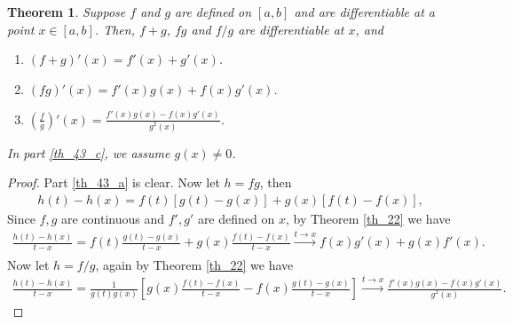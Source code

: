 \documentclass[10pt]{book}
\newtheorem{theorem}{Theorem}[chapter]
\theoremstyle{definition}
\numberwithin{equation}{chapter}
\begin{document}
\medskip

\begin{theorem}\label{th_43}
Suppose $f$ and $g$ are defined on $[a,b]$ and are differentiable at a point $x \in [a,b]$. Then, $f + g$, $fg$ and $f/g$ are differentiable at $x$, and
\begin{enumerate}[label=(\alph*)]
    \item $(f + g)'(x) = f'(x) + g'(x)$. \label{th_43_a}
    
    \item $(fg)'(x) = f'(x)g(x) + f(x)g'(x)$. \label{th_43_b}
    
    \item $\displaystyle \left(\frac{f}{g}\right)'(x) = \frac{f'(x)g(x) - f(x)g'(x)}{g^2(x)}$. \label{th_43_c}
\end{enumerate}
In part \ref{th_43_c}, we assume $g(x) \neq 0$.
\end{theorem}
\begin{proof}
Part \ref{th_43_a} is clear. Now let $h = fg$, then
\begin{align*}
    h(t) - h(x) = f(t)[g(t) - g(x)] + g(x)[f(t) - f(x)],
\end{align*}
Since $f, g$ are continuous and $f',g'$ are defined on $x$, by Theorem \ref{th_22} we have
\begin{align*}
    \frac{h(t) - h(x)}{t - x} = f(t) \frac{g(t) - g(x)}{t - x} + g(x) \frac{f(t) - f(x)}{t - x} \xrightarrow[]{t \to x} f(x)g'(x) + g(x) f'(x).
\end{align*}
Now let $h = f/g$, again by Theorem \ref{th_22} we have
\begin{align*}
    \frac{h(t) - h(x)}{t - x} = \frac{1}{g(t)g(x)} \left[g(x) \frac{f(t) - f(x)}{t - x} - f(x) \frac{g(t) - g(x)}{t - x} \right] \xrightarrow[]{t \to x} \frac{f'(x)g(x) - f(x)g'(x)}{g^2(x)}.
\end{align*}
\end{proof}

\medskip
\end{document}

